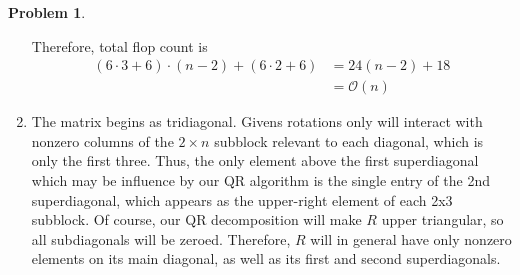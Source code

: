 \documentclass[12pt]{article}
\theoremstyle{definition}
\newtheorem{prob}{Problem}
\begin{document}
\begin{prob}
\begin{enumerate}[\bfseries(a)]
                    Therefore, total flop count is
                    \begin{align*}
                        (6\cdot3 + 6)\cdot(n-2) + (6\cdot2 + 6) &= 24(n-2) + 18 \\
                                                                &= \mathcal{O}\left(n\right)
                    \end{align*}
        \item The matrix begins as tridiagonal. Givens rotations only will interact with nonzero columns
            of the $2\times n$ subblock relevant to each diagonal, which is only the first three.
            Thus, the only element above the first superdiagonal which may be influence by our QR algorithm
            is the single entry of the 2nd superdiagonal, which appears as the upper-right element of each
            2x3 subblock. Of course, our QR decomposition will make $R$ upper triangular, so all subdiagonals
            will be zeroed. Therefore, $R$ will in general have only nonzero elements on its main diagonal,
            as well as its first and second superdiagonals.
    \end{enumerate}
\end{prob}
\end{document}
